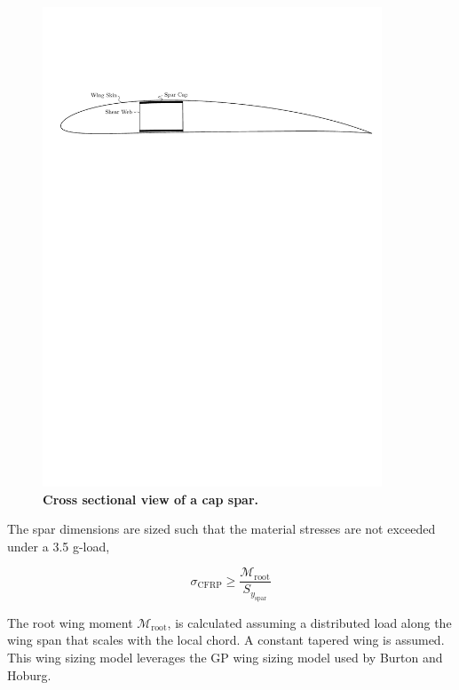 \documentclass[]{aiaa-tc}%
\begin{document}
\begin{figure}[h!]
	\begin{center}
	\includegraphics[width=0.9\textwidth]{capspar.pdf}
    \caption{\textbf{Cross sectional view of a cap spar.}}
	\label{f:capspar}
	\end{center}
\end{figure}

The spar dimensions are sized such that the material stresses are not exceeded under a 3.5 g-load,

\begin{equation}
    \sigma_{\mathrm{CFRP}} \geq \frac{\mathcal{M}_{\mathrm{root}}}{S_{y_{\mathrm{spar}}}}
\end{equation}

The root wing moment $\mathcal{M}_{\mathrm{root}}$, is calculated assuming a distributed load along the wing span that scales with the local chord.\cite{bending}
A constant tapered wing is assumed.  
This wing sizing model leverages the GP wing sizing model used by Burton and Hoburg.\cite{burton_solar_2017} 
\end{document}
